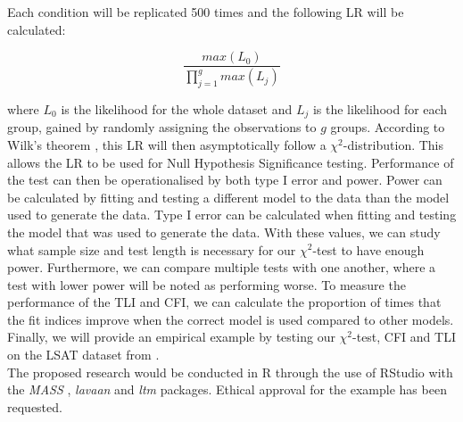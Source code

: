 \documentclass{article}
\begin{document}
Each condition will be replicated 500 times and the following LR will be calculated:

\begin{equation}
\frac{max(L_0)}{\prod_{j = 1}^g max(L_j)}
\end{equation}

where $L_0$ is the likelihood for the whole dataset and $L_j$ is the likelihood for each group, gained by randomly assigning the observations to $g$ groups. According to Wilk's theorem \autocite{wilkth}, this LR will then asymptotically follow a $\chi^2$-distribution. This allows the LR to be used for Null Hypothesis Significance testing. Performance of the test can then be operationalised by both type I error and power. Power can be calculated by fitting and testing a different model to the data than the model used to generate the data. Type I error can be calculated when fitting and testing the model that was used to generate the data. With these values, we can study what sample size and test length is necessary for our $\chi^2$-test to have enough power. Furthermore, we can compare multiple tests with one another, where a test with lower power will be noted as performing worse. To measure the performance of the TLI and CFI, we can calculate the proportion of times that the fit indices improve when the correct model is used compared to other models. Finally, we will provide an empirical example by testing our $\chi^2$-test, CFI and TLI on the LSAT dataset from \textcite{dataset}. \\
\indent The proposed research would be conducted in R \autocite{R} through the use of RStudio \autocite{Rstudio} with the \textit{MASS} \autocite{mass}, \textit{lavaan} \autocite{lavaan} and \textit{ltm} \autocite{ltmpack} packages. Ethical approval for the example has been requested.


\nocite{*}

\newpage
\printbibliography
\end{document}
